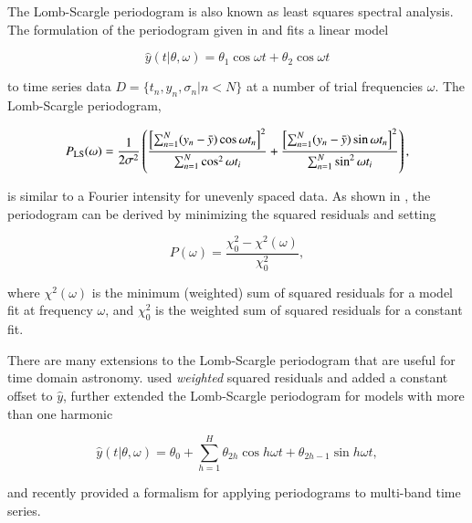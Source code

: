 \documentclass{webofc}
\begin{document}
The Lomb-Scargle periodogram \cite{Lomb_1976,Scargle_1982,Barning_1963,Vanicek_1971} is also known as least squares spectral analysis. 
The formulation of the periodogram given in \cite{Lomb_1976} and \cite{Scargle_1982} fits a linear model

\begin{equation}\label{eq:lsmodel}
\hat{y}(t|\theta, \omega) = \theta_1\cos{\omega t} + \theta_2\cos{\omega t}
\end{equation}

\noindent to time series data $D = \{t_n, y_n, \sigma_n|n < N\}$ at a number of trial frequencies $\omega$. The Lomb-Scargle periodogram,

\begin{equation}\label{eq:ls}
    P_{\rm LS}(\omega) = \frac{1}{2\sigma^2}\left(\frac{\left[\sum_{n=1}^N (y_n - \bar{y})\cos{\omega t_n}\right]^2}{\sum_{n=1}^N \cos^2{\omega t_i}} + \frac{\left[\sum_{n=1}^N (y_n - \bar{y})\sin{\omega t_n}\right]^2}{\sum_{n=1}^N \sin^2{\omega t_i}} \right),
\end{equation}

\noindent is similar to a Fourier intensity for unevenly spaced data. As shown in \cite{Scargle_1982}, the periodogram can be derived by minimizing the squared residuals and setting

\begin{equation}\label{eq:chi2pdg}
P(\omega) = \frac{\chi^2_0 - \chi^2(\omega)}{\chi^2_0},
\end{equation}

\noindent where $\chi^2(\omega)$ is the minimum (weighted) sum of squared residuals for a model fit at frequency $\omega$, and $\chi^2_0$ is the
weighted sum of squared residuals for a constant fit.

There are many extensions to the Lomb-Scargle periodogram that are useful for time domain astronomy. \cite{Zechmeister+Kurster_2009} 
used \emph{weighted} squared residuals and added a constant offset to $\hat{y}$, \cite{Schwarzenberg-Czerny_1996,Palmer_2009} further extended the Lomb-Scargle 
periodogram for models with more than one harmonic

\begin{equation}\label{eq:lsharm}
\hat{y}(t|\theta, \omega) = \theta_0 + \sum_{h=1}^{H}\theta_{2h}\cos{h\omega t} + \theta_{2h - 1}\sin{h\omega t},
\end{equation}

\noindent and recently \cite{Vanderplas+Ivezic_2015} provided a formalism for applying periodograms to multi-band time series.
\end{document}
